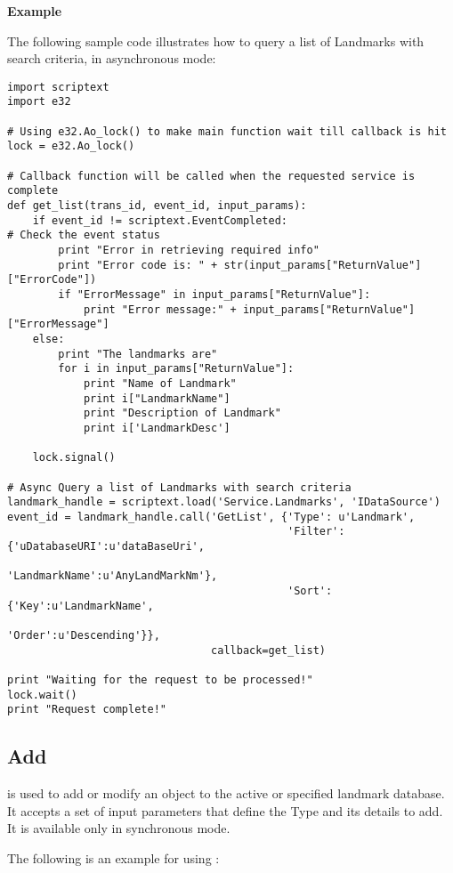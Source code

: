 {\bf Example} \break

The following sample code illustrates how to query a list of Landmarks with search criteria, in asynchronous mode:

\begin{verbatim}
import scriptext
import e32

# Using e32.Ao_lock() to make main function wait till callback is hit
lock = e32.Ao_lock()

# Callback function will be called when the requested service is complete
def get_list(trans_id, event_id, input_params):
    if event_id != scriptext.EventCompleted:   
# Check the event status
        print "Error in retrieving required info"
        print "Error code is: " + str(input_params["ReturnValue"]["ErrorCode"])
        if "ErrorMessage" in input_params["ReturnValue"]:
            print "Error message:" + input_params["ReturnValue"]["ErrorMessage"]
    else:
        print "The landmarks are"
        for i in input_params["ReturnValue"]:
            print "Name of Landmark"
            print i["LandmarkName"]
            print "Description of Landmark"
            print i['LandmarkDesc']

    lock.signal()

# Async Query a list of Landmarks with search criteria
landmark_handle = scriptext.load('Service.Landmarks', 'IDataSource')
event_id = landmark_handle.call('GetList', {'Type': u'Landmark',
                                            'Filter': {'uDatabaseURI':u'dataBaseUri',
                                                      'LandmarkName':u'AnyLandMarkNm'},
                                            'Sort': {'Key':u'LandmarkName',
                                                     'Order':u'Descending'}}, 
                                callback=get_list)

print "Waiting for the request to be processed!"
lock.wait()
print "Request complete!"
\end{verbatim}

\subsection{Add}
\label{subsec:landmarkadd}

 is used to add or modify an object to the active or specified landmark database. It accepts a set of input parameters that define the Type and its details to add. It is available only in synchronous mode.

The following is an example for using :

